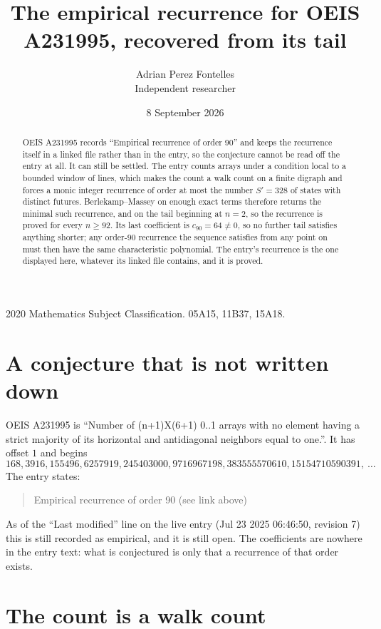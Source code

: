 \documentclass[11pt,a4paper]{article}
\title{The empirical recurrence for OEIS A231995, recovered from its tail}
\author{Adrian Perez Fontelles\\ \small Independent researcher}
\date{8 September 2026}
\theoremstyle{plain}
\theoremstyle{definition}
\begin{document}
\maketitle

\begin{abstract}
OEIS A231995 records ``Empirical recurrence of order $90$'' and keeps the recurrence itself in
a linked file rather than in the entry, so the conjecture cannot be read off the entry at all.
It can still be settled. The entry counts arrays under a condition local to a bounded window of
lines, which makes the count a walk count on a finite digraph and forces a monic integer
recurrence of order at most the number $S'=328$ of states with distinct futures. Berlekamp--Massey on
enough exact terms therefore returns the minimal such recurrence, and on the tail beginning at $n=2$, so the recurrence is proved for every $n\ge92$.
Its last coefficient is $c_{90}=64\neq0$, so no further tail satisfies anything
shorter; any order-$90$ recurrence the sequence satisfies from any point on must then have
the same characteristic polynomial. The entry's recurrence is the one displayed here, whatever
its linked file contains, and it is proved.
\end{abstract}

\noindent\small 2020 Mathematics Subject Classification. 05A15, 11B37, 15A18.\normalsize

\section{A conjecture that is not written down}

OEIS A231995 is ``Number of (n+1)X(6+1) 0..1 arrays with no element having a strict majority of its horizontal and antidiagonal neighbors equal to one.''. It has offset $1$ and begins
\[
168, 3916, 155496, 6257919, 245403000, 9716967198, 383555570610, 15154710590391,\ \dots
\]
The entry states:
\begin{quote}
Empirical recurrence of order 90 (see link above)
\end{quote}
As of the ``Last modified'' line on the live entry (Jul 23 2025 06:46:50, revision 7)
this is still recorded as empirical, and it is still open. The coefficients are nowhere in the
entry text: what is conjectured is only that a recurrence of that order exists.

\section{The count is a walk count}
\end{document}
